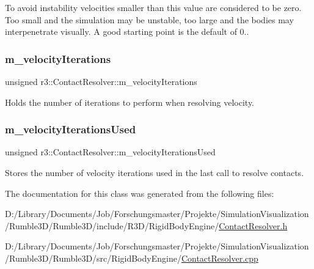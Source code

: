 To avoid instability velocities smaller than this value are considered to be zero. Too small and the simulation may be unstable, too large and the bodies may interpenetrate visually. A good starting point is the default of 0.. \mbox{\label{classr3_1_1_contact_resolver_a5ebf50739d29cfd44c839f0949653f56}} 
\subsubsection{\texorpdfstring{m\+\_\+velocity\+Iterations}{m\_velocityIterations}}
{\footnotesize\ttfamily unsigned r3\+::\+Contact\+Resolver\+::m\+\_\+velocity\+Iterations\hspace{0.3cm}{\ttfamily [protected]}}

Holds the number of iterations to perform when resolving velocity. \mbox{\label{classr3_1_1_contact_resolver_a1d02afed1bbae067eee7792fcb859278}} 
\subsubsection{\texorpdfstring{m\+\_\+velocity\+Iterations\+Used}{m\_velocityIterationsUsed}}
{\footnotesize\ttfamily unsigned r3\+::\+Contact\+Resolver\+::m\+\_\+velocity\+Iterations\+Used\hspace{0.3cm}{\ttfamily [protected]}}

Stores the number of velocity iterations used in the last call to resolve contacts. 

The documentation for this class was generated from the following files\+:\begin{DoxyCompactItemize}
\item 
D\+:/\+Library/\+Documents/\+Job/\+Forschungsmaster/\+Projekte/\+Simulation\+Visualization/\+Rumble3\+D/\+Rumble3\+D/include/\+R3\+D/\+Rigid\+Body\+Engine/\mbox{\hyperlink{_contact_resolver_8h}{Contact\+Resolver.\+h}}\item 
D\+:/\+Library/\+Documents/\+Job/\+Forschungsmaster/\+Projekte/\+Simulation\+Visualization/\+Rumble3\+D/\+Rumble3\+D/src/\+Rigid\+Body\+Engine/\mbox{\hyperlink{_contact_resolver_8cpp}{Contact\+Resolver.\+cpp}}\end{DoxyCompactItemize}
